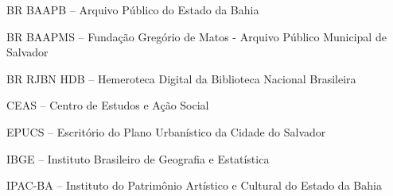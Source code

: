 \begin{siglas}
\item BR BAAPB -- Arquivo Público do Estado da Bahia
\item BR BAAPMS -- Fundação Gregório de Matos - Arquivo Público Municipal de Salvador
\item BR RJBN HDB -- Hemeroteca Digital da Biblioteca Nacional Brasileira
\item CEAS -- Centro de Estudos e Ação Social
\item EPUCS -- Escritório do Plano Urbanístico da Cidade do Salvador
\item IBGE -- Instituto Brasileiro de Geografia e Estatística
\item IPAC-BA -- Instituto do Patrimônio Artístico e Cultural do Estado da Bahia
\end{siglas}